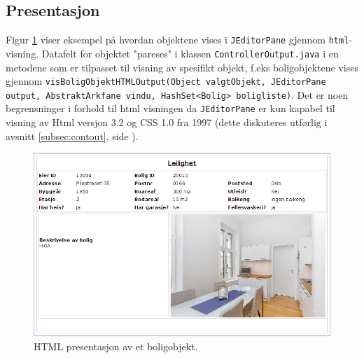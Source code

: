 \subsection{Presentasjon}
Figur \ref{fig:presentasjon} viser eksempel på hvordan objektene vises i \texttt{JEditorPane} gjennom \texttt{html}-visning. Datafelt for objektet "pareses" i klassen \texttt{ControllerOutput.java} i en metodene som er tilpasset til visning av spesifikt objekt, f.eks boligobjektene vises gjennom \linebreak \texttt{visBoligObjektHTMLOutput(Object valgtObjekt, JEditorPane output, AbstraktArkfane vindu, HashSet<Bolig> boligliste)}. Det er noen begrensninger i forhold til html visningen da \texttt{JEditorPane} er kun kapabel til visning av Html versjon 3.2 og CSS 1.0 fra 1997 (dette diskuteres utførlig i avsnitt \ref{subsec:contout}, side \pageref{subsec:contout}). 

\begin{figure}[ht!]
 \includegraphics[width=\textwidth,height=\textheight,keepaspectratio]{./img/produktdokumentasjon/visuelle_detaljer/presentasjon.png}
 \caption{HTML presentasjon av et boligobjekt.}
 \label{fig:presentasjon}
\end{figure}


